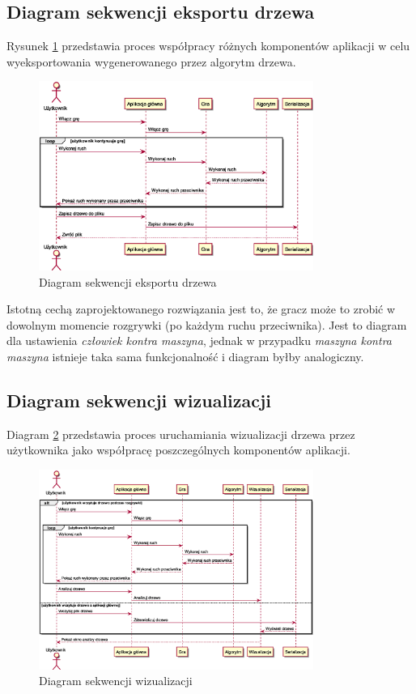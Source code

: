 \documentclass{article}
\newcommand{\modulename}[1]{\textit{#1}}
\begin{document}
	\subsection{Diagram sekwencji eksportu drzewa}
	Rysunek \ref{rys:sequenceserialize} przedstawia proces współpracy różnych komponentów aplikacji w celu wyeksportowania wygenerowanego przez algorytm drzewa.
	\begin{figure}[h]
		\centering
		\includegraphics[width=0.8\textwidth]{serialize_sequence}
		\caption{Diagram sekwencji eksportu drzewa}
		\label{rys:sequenceserialize}
	\end{figure}

	\noindent Istotną cechą zaprojektowanego rozwiązania jest to, że gracz może to zrobić w dowolnym momencie rozgrywki (po każdym ruchu przeciwnika). Jest to diagram dla ustawienia \modulename{człowiek kontra maszyna}, jednak w przypadku \modulename{maszyna kontra maszyna} istnieje taka sama funkcjonalność i diagram byłby analogiczny.
	
	\clearpage
	\subsection{Diagram sekwencji wizualizacji}
	Diagram \ref{rys:sequencevisualise} przedstawia proces uruchamiania wizualizacji drzewa przez użytkownika jako współpracę poszczególnych komponentów aplikacji.
	\begin{figure}[h]
		\centering
		\includegraphics[width=0.8\textwidth]{visualization_sequence}
		\caption{Diagram sekwencji wizualizacji}
		\label{rys:sequencevisualise}
	\end{figure}
\end{document}
